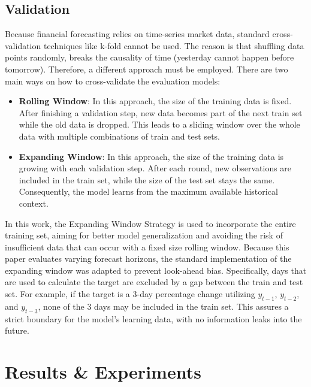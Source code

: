 \documentclass[Master,english,IEEE]{twbook}
\begin{document}
\section{Validation}
Because financial forecasting relies on time-series market data, standard cross-validation techniques like k-fold cannot be used. The reason is that shuffling data points randomly, breaks the causality of time (yesterday cannot happen before tomorrow). Therefore, a different approach must be employed. There are two main ways on how to cross-validate the evaluation models:

\begin{itemize}
    \item \textbf{Rolling Window}: In this approach, the size of the training data is fixed. After finishing a validation step, new data becomes part of the next train set while the old data is dropped. This leads to a sliding window over the whole data with multiple combinations of train and test sets.
    \item \textbf{Expanding Window}: In this approach, the size of the training data is growing with each validation step. After each round, new observations are included in the train set, while the size of the test set stays the same. Consequently, the model learns from the maximum available historical context.
\end{itemize}

In this work, the Expanding Window Strategy is used to incorporate the entire training set, aiming for better model generalization and avoiding the risk of insufficient data that can occur with a fixed size rolling window. Because this paper evaluates varying forecast horizons, the standard implementation of the expanding window was adapted to prevent look-ahead bias. Specifically, days that are used to calculate the target are excluded by a gap between the train and test set. For example, if the target is a 3-day percentage change utilizing $y_{t-1}$, $y_{t-2}$, and $y_{t-3}$, none of the 3 days may be included in the train set. This assures a strict boundary for the model's learning data, with no information leaks into the future.

\chapter{Results \& Experiments}
\end{document}
